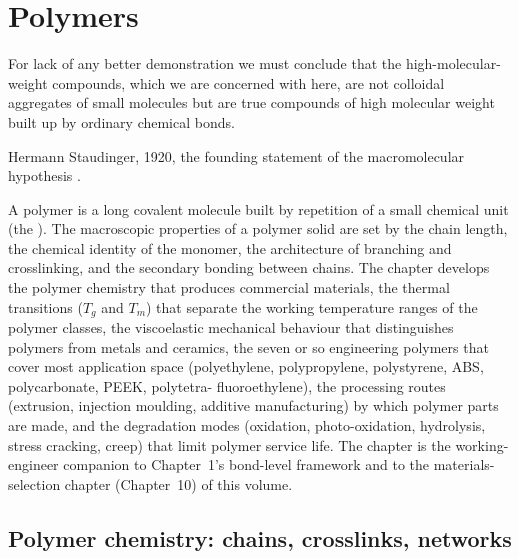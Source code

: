 \chapter{Polymers}
\label{vol05:ch06}

\epigraph{For lack of any better demonstration we must conclude that
the high-molecular-weight compounds, which we are concerned with here,
are not colloidal aggregates of small molecules but are true compounds
of high molecular weight built up by ordinary chemical bonds.}{Hermann
Staudinger, 1920, the founding statement of the macromolecular
hypothesis \cite[pp.~1073--1085]{hist:staudinger1920}.}


\noindent
A polymer is a long covalent molecule built by repetition of a small
chemical unit (the ). The macroscopic properties of
a polymer solid are set by the chain length, the chemical identity of
the monomer, the architecture of branching and crosslinking, and the
secondary bonding between chains. The chapter develops the polymer
chemistry that produces commercial materials, the thermal transitions
($T_g$ and $T_m$) that separate the working temperature ranges of the
polymer classes, the viscoelastic mechanical behaviour that
distinguishes polymers from metals and ceramics, the seven or so
engineering polymers that cover most application space (polyethylene,
polypropylene, polystyrene, ABS, polycarbonate, PEEK, polytetra-
fluoroethylene), the processing routes (extrusion, injection moulding,
additive manufacturing) by which polymer parts are made, and the
degradation modes (oxidation, photo-oxidation, hydrolysis, stress
cracking, creep) that limit polymer service life. The chapter is the
working-engineer companion to Chapter~1's bond-level framework and to
the materials-selection chapter (Chapter~10) of this volume.

\section{Polymer chemistry: chains, crosslinks, networks}

